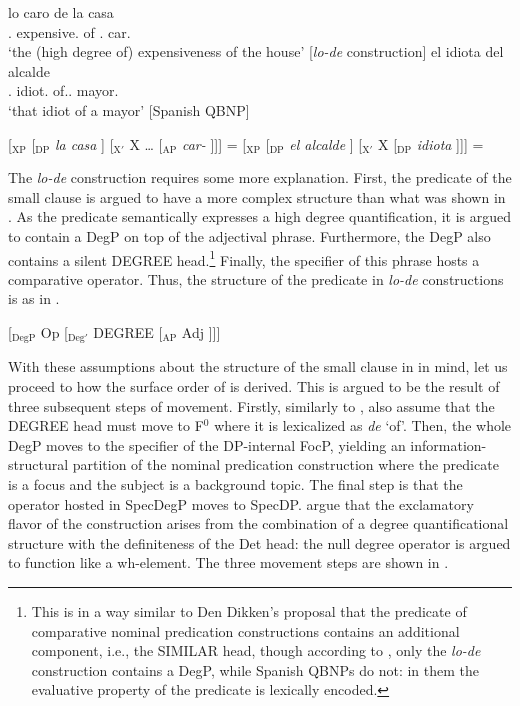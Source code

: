 \documentclass[output=paper]{langscibook}
\begin{document}
\ea
\ea \label{ge-ex-sp-lode}
\gll lo caro de la casa \\
\Def{}.\N{} expensive.\N{} of \Def{}.\F{} car.\F{} \\
\glt `the (high degree of) expensiveness of the house' \hfill [\emph{lo-de} construction]
\ex \label{ge-ex-sp-qbnp}
\gll el idiota del alcalde \\
\Def{}.\M{} idiot.\M{} of.\Def{}.\M{} mayor.\M{} \\
\glt `that idiot of a mayor' \hfill [Spanish QBNP]
\z 
\z 

\ea
\ea \label{ge-br-sp-lode}
[$_\text{XP}$ [$_{\text{DP}}$ \emph{la casa} ] [$_{\text{X}'}$  X \ldots{} [$_\text{AP}$ \emph{car-} ]]] \hfill = 
\ex \label{ge-br-sp-qbnp}
[$_\text{XP}$ [$_{\text{DP}}$ \emph{el alcalde} ] [$_{\text{X}'}$  X [$_\text{DP}$ \emph{idiota} ]]] \hfill = 
\z
\z

\noindent The \emph{lo-de} construction requires some more explanation. First, the predicate of the small clause is argued to have a more complex structure than what was shown in . As the predicate semantically expresses a high degree quantification, it is argued to contain a DegP on top of the adjectival phrase. Furthermore, the DegP also contains a silent DEGREE head.\footnote{This is in a way similar to Den Dikken's proposal that the predicate of comparative nominal predication constructions contains an additional component, i.e., the SIMILAR head, though according to \citet{VillalbaBartra-Kaufman2010}, only the \emph{lo-de} construction contains a DegP, while Spanish QBNPs do not: in them the evaluative property of the predicate is lexically encoded.} Finally, the specifier of this phrase hosts a comparative operator. Thus, the structure of the predicate in \emph{lo-de} constructions is as in .

\ea \label{ge-br-degp}
[$_\text{DegP}$ Op [$_{\text{Deg}'}$ DEGREE [$_\text{AP}$ Adj ]]] %
\z

\noindent With these assumptions about the structure of the small clause in  in mind, let us proceed to how the surface order of  is derived. This is argued to be the result of three subsequent steps of movement. 
Firstly, similarly to \citet{denDikken2006}, \citet{VillalbaBartra-Kaufman2010} also assume that the DEGREE head must move to F$^0$ where it is lexicalized as \emph{de} `of'. Then, the whole DegP moves to the specifier of the DP-internal FocP, yielding an information-structural partition of the nominal predication construction where the predicate is a focus and the subject is a background topic. The final step is that the operator hosted in SpecDegP moves to SpecDP. \citet{VillalbaBartra-Kaufman2010} argue that the exclamatory flavor of the construction arises from the combination of a degree quantificational structure with the definiteness of the Det head: the null degree operator is argued to function like a wh-element. The three movement steps are shown in . 
\end{document}
